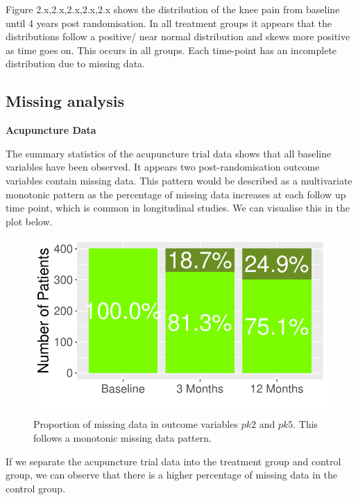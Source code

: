 \documentclass{article}
\newcommand{\pandocbounded}[1]{#1}
\begin{document}
Figure 2.x,2.x,2.x,2.x,2.x shows the distribution of the knee pain from
baseline until 4 years post randomisation. In all treatment groups it
appears that the distributions follow a positive/ near normal
distribution and skews more positive as time goes on. This occurs in all
groups. Each time-point has an incomplete distribution due to missing
data.

\newpage

\subsection{Missing analysis}\label{missing-analysis}

\textbf{Acupuncture Data}

The summary statistics of the acupuncture trial data shows that all
baseline variables have been observed. It appears two post-randomisation
outcome variables contain missing data. This pattern would be described
as a multivariate monotonic pattern as the percentage of missing data
increases at each follow up time point, which is common in longitudinal
studies. We can visualise this in the plot below.

\begin{figure}
\centering
\pandocbounded{\includegraphics[keepaspectratio]{Final_Report_files/figure-latex/unnamed-chunk-24-1.pdf}}
\caption{Proportion of missing data in outcome variables \(pk2\) and
\(pk5\). This follows a monotonic missing data pattern.}
\end{figure}

If we separate the acupuncture trial data into the treatment group and
control group, we can observe that there is a higher percentage of
missing data in the control group.
\end{document}
